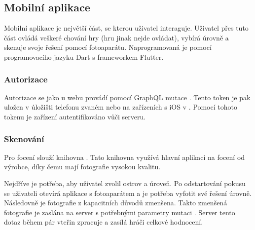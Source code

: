 \subsection{Mobilní aplikace}
Mobilní aplikace je největší část, se kterou uživatel interaguje. Uživatel přes tuto část ovládá veškeré chování hry (hru jinak nejde ovládat), vybírá úrovně a skenuje svoje řešení pomocí fotoaparátu. Naprogramovaná je pomocí programovacího jazyku Dart s frameworkem Flutter. 

\subsubsection{Autorizace}
Autorizace se jako u webu provádí pomocí GraphQL mutace . Tento token je pak uložen v úložišti telefonu zvaném \cite{SharedPreferences} nebo na zařízeních s iOS v \cite{NSUserDefaults}. Pomocí tohoto tokenu je zařízení autentifikováno vůči serveru.

\subsubsection{Skenování}
Pro focení slouží knihovna \cite{ImagePicker}. Tato knihovna využívá hlavní aplikaci na focení od výrobce, díky čemu mají fotografie vysokou kvalitu.\par
Nejdříve je potřeba, aby uživatel zvolil ostrov a úroveň. Po odstartování pokusu se uživateli otevírá aplikace s fotoaparátem a je potřeba vyfotit své řešení úrovně. Následovně je fotografie z kapacitních důvodů zmenšena. Takto zmenšená fotografie je zaslána na server s potřebnými parametry mutaci . Server tento dotaz během pár vteřin zpracuje a zasílá hráči celkové hodnocení.
